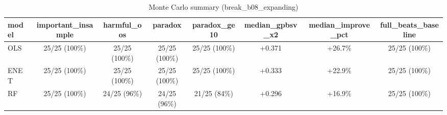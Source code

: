\begin{table}
\centering
\caption{Monte Carlo summary (break_b08_expanding)}
\label{tab:break_b08_expanding}
\begin{tabular}{lccccccc}
\toprule
model & important_insample &    harmful_oos &        paradox &   paradox_ge10 & median_gpbsv_x2 & median_improve_pct & full_beats_baseline \\
\midrule
  OLS &      25/25 (100\%) &  25/25 (100\%) &  25/25 (100\%) &  25/25 (100\%) &          +0.371 &            +26.7\% &       25/25 (100\%) \\
 ENET &      25/25 (100\%) &  25/25 (100\%) &  25/25 (100\%) &  25/25 (100\%) &          +0.333 &            +22.9\% &       25/25 (100\%) \\
   RF &      25/25 (100\%) &   24/25 (96\%) &   24/25 (96\%) &   21/25 (84\%) &          +0.296 &            +16.9\% &       25/25 (100\%) \\
\bottomrule
\end{tabular}
\end{table}
